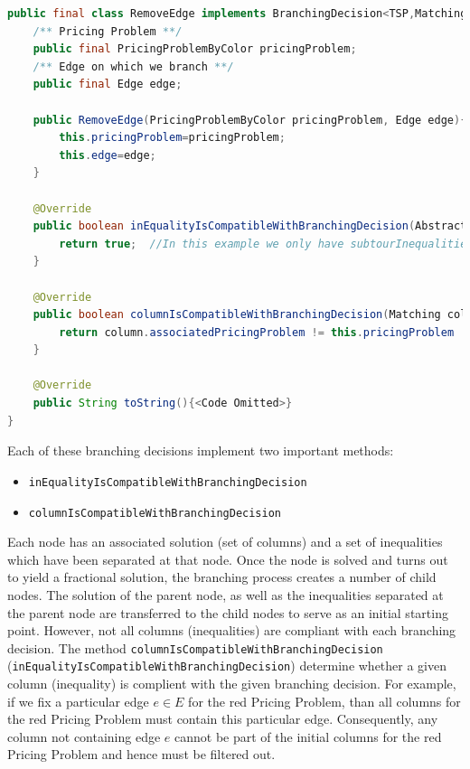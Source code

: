 \documentclass[a4paper]{article}
\newenvironment{myblock}[1]{%
    \tcolorbox[beamer,%
    noparskip,breakable,
    colback=lightBlueCodeBlock,colframe=darkBlueCodeBlock,%
    colbacklower=darkBlueCodeBlock!75!lightBlueCodeBlock,%
    coltitle=blueTitleCodeBlock,
    title=#1]}%
    {\endtcolorbox}
\newcommand{\code}[1]{\lstinline[language=java, style=seminar]!#1!}
\begin{document}
\begin{myblock}{Branching decision 2: RemoveEdge}
\begin{lstlisting}[language=java, style=eclipseArticle, xleftmargin=2em]  
public final class RemoveEdge implements BranchingDecision<TSP,Matching> {
    /** Pricing Problem **/
    public final PricingProblemByColor pricingProblem;
    /** Edge on which we branch **/
    public final Edge edge;

    public RemoveEdge(PricingProblemByColor pricingProblem, Edge edge){
        this.pricingProblem=pricingProblem;
        this.edge=edge;
    }

    @Override
    public boolean inEqualityIsCompatibleWithBranchingDecision(AbstractInequality inequality) {
        return true;  //In this example we only have subtourInequalities. They remain valid, independent of whether we remove an edge.
    }

    @Override
    public boolean columnIsCompatibleWithBranchingDecision(Matching column) {
        return column.associatedPricingProblem != this.pricingProblem || !column.edges.contains(edge);
    }

    @Override
    public String toString(){<Code Omitted>}
}
\end{lstlisting}
\end{myblock}
Each of these branching decisions implement two important methods:
\begin{itemize}
 \item \code{inEqualityIsCompatibleWithBranchingDecision}
 \item \code{columnIsCompatibleWithBranchingDecision}
\end{itemize}
Each node has an associated solution (set of columns) and a set of inequalities which have been separated at that node. Once the node is solved and turns out to yield a fractional solution, the branching process creates a number of child nodes. The solution of the parent node, as well as the inequalities separated at the parent node are transferred to the child nodes to serve as an initial starting point. However, not all columns (inequalities) are compliant with each branching decision. The method \code{columnIsCompatibleWithBranchingDecision} (\code{inEqualityIsCompatibleWithBranchingDecision}) determine whether a given column (inequality) is complient with the given branching decision. For example, if we fix a particular edge $e\in E$ for the red Pricing Problem, than all columns for the red Pricing Problem must contain this particular edge. Consequently, any column not containing edge $e$ cannot be part of the initial columns for the red Pricing Problem and hence must be filtered out.\\
\end{document}
